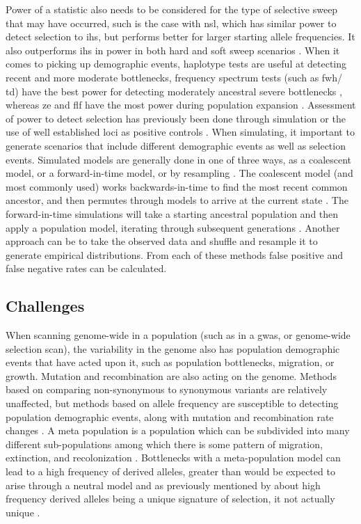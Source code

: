 \documentclass[twoside,openright]{report}
\begin{document}
Power of a statistic also needs to be considered for the type of
selective sweep that may have occurred, such is the case with \gls{nsl},
which has similar power to detect selection to \gls{ihs}, but performs
better for larger starting allele frequencies. It also outperforms
\gls{ihs} in power in both hard and soft sweep scenarios
\citep{Ferrer-Admetlla2014}. When it comes to picking up demographic
events, haplotype tests are useful at detecting recent and more moderate
bottlenecks, frequency spectrum tests (such as \gls{fwh}/ \gls{td}) have
the best power for detecting moderately ancestral severe bottlenecks
\citep{Depaulis2003}, whereas \gls{ze} and \gls{flf} have the most power
during population expansion \citep{Zeng2006, Ramirez-Soriano2008}.
Assessment of power to detect selection has previously been done through
simulation or the use of well established loci as positive controls
\citep{voight2006map, Zhai2009, Cadzow2016}. When simulating, it
important to generate scenarios that include different demographic
events as well as selection events. Simulated models are generally done
in one of three ways, as a coalescent model, or a forward-in-time model,
or by resampling \citep{Yuan2012}. The coalescent model (and most
commonly used) works backwards-in-time to find the most recent common
ancestor, and then permutes through models to arrive at the current
state \citep{kingman_genealogy_1982, Yuan2012}. The forward-in-time
simulations will take a starting ancestral population and then apply a
population model, iterating through subsequent generations
\citep{peng_forward-time_2010, Yuan2012}. Another approach can be to
take the observed data and shuffle and resample it to generate empirical
distributions. From each of these methods false positive and false
negative rates can be calculated.

\subsection{Challenges}\label{challenges}

When scanning genome-wide in a population (such as in a \gls{gwas}, or
genome-wide selection scan), the variability in the genome also has
population demographic events that have acted upon it, such as
population bottlenecks, migration, or growth. Mutation and recombination
are also acting on the genome. Methods based on comparing non-synonymous
to synonymous variants are relatively unaffected, but methods based on
allele frequency are susceptible to detecting population demographic
events, along with mutation and recombination rate changes
\citep{Nielsen2009}. A meta population is a population which can be
subdivided into many different sub-populations among which there is some
pattern of migration, extinction, and recolonization
\citep{Wakeley2001}. Bottlenecks with a meta-population model can lead
to a high frequency of derived alleles, greater than would be expected
to arise through a neutral model \citep{Jensen2005} and as previously
mentioned by \citet{fay2000hitchhiking} about high frequency derived
alleles being a unique signature of selection, it not actually unique
\citep{Przeworski2002}.
\end{document}
